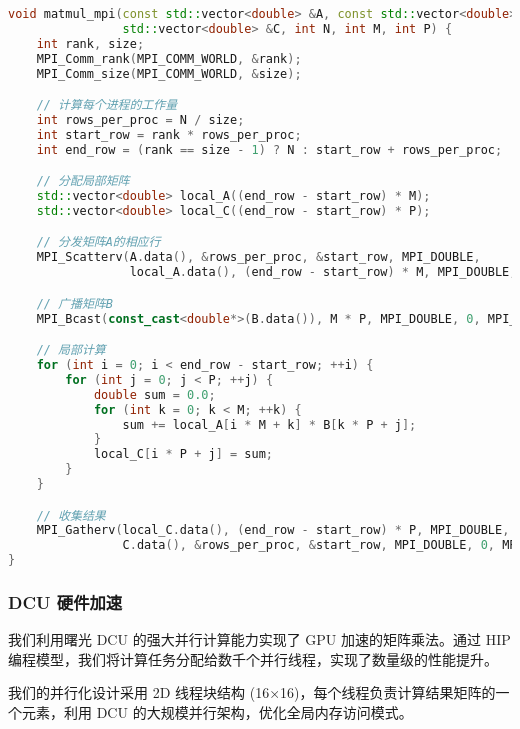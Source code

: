 \documentclass[12pt,a4paper]{article}
\begin{document}
\begin{lstlisting}[language=c++,caption=MPI分布式矩阵乘法,breaklines=true]
void matmul_mpi(const std::vector<double> &A, const std::vector<double> &B,
                std::vector<double> &C, int N, int M, int P) {
    int rank, size;
    MPI_Comm_rank(MPI_COMM_WORLD, &rank);
    MPI_Comm_size(MPI_COMM_WORLD, &size);

    // 计算每个进程的工作量
    int rows_per_proc = N / size;
    int start_row = rank * rows_per_proc;
    int end_row = (rank == size - 1) ? N : start_row + rows_per_proc;

    // 分配局部矩阵
    std::vector<double> local_A((end_row - start_row) * M);
    std::vector<double> local_C((end_row - start_row) * P);

    // 分发矩阵A的相应行
    MPI_Scatterv(A.data(), &rows_per_proc, &start_row, MPI_DOUBLE,
                 local_A.data(), (end_row - start_row) * M, MPI_DOUBLE, 0, MPI_COMM_WORLD);

    // 广播矩阵B
    MPI_Bcast(const_cast<double*>(B.data()), M * P, MPI_DOUBLE, 0, MPI_COMM_WORLD);

    // 局部计算
    for (int i = 0; i < end_row - start_row; ++i) {
        for (int j = 0; j < P; ++j) {
            double sum = 0.0;
            for (int k = 0; k < M; ++k) {
                sum += local_A[i * M + k] * B[k * P + j];
            }
            local_C[i * P + j] = sum;
        }
    }

    // 收集结果
    MPI_Gatherv(local_C.data(), (end_row - start_row) * P, MPI_DOUBLE,
                C.data(), &rows_per_proc, &start_row, MPI_DOUBLE, 0, MPI_COMM_WORLD);
}
\end{lstlisting}

\subsubsection{DCU 硬件加速}

我们利用曙光 DCU 的强大并行计算能力实现了 GPU 加速的矩阵乘法。通过 HIP 编程模型，我们将计算任务分配给数千个并行线程，实现了数量级的性能提升。

我们的并行化设计采用 2D 线程块结构 (16×16)，每个线程负责计算结果矩阵的一个元素，利用 DCU 的大规模并行架构，优化全局内存访问模式。
\end{document}
